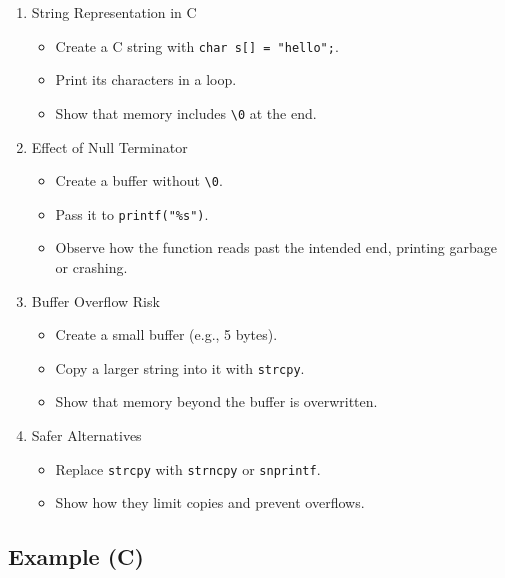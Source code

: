 \documentclass[
  letterpaper,
  DIV=11,
  numbers=noendperiod]{scrreprt}
\providecommand{\tightlist}{%
  \setlength{\itemsep}{0pt}\setlength{\parskip}{0pt}}
\begin{document}
\begin{enumerate}
\def\labelenumi{\arabic{enumi}.}
\item
  String Representation in C

  \begin{itemize}
  \tightlist
  \item
    Create a C string with \texttt{char\ s{[}{]}\ =\ "hello";}.
  \item
    Print its characters in a loop.
  \item
    Show that memory includes
    \texttt{\textquotesingle{}\textbackslash{}0\textquotesingle{}} at
    the end.
  \end{itemize}
\item
  Effect of Null Terminator

  \begin{itemize}
  \tightlist
  \item
    Create a buffer without
    \texttt{\textquotesingle{}\textbackslash{}0\textquotesingle{}}.
  \item
    Pass it to \texttt{printf("\%s")}.
  \item
    Observe how the function reads past the intended end, printing
    garbage or crashing.
  \end{itemize}
\item
  Buffer Overflow Risk

  \begin{itemize}
  \tightlist
  \item
    Create a small buffer (e.g., 5 bytes).
  \item
    Copy a larger string into it with \texttt{strcpy}.
  \item
    Show that memory beyond the buffer is overwritten.
  \end{itemize}
\item
  Safer Alternatives

  \begin{itemize}
  \tightlist
  \item
    Replace \texttt{strcpy} with \texttt{strncpy} or \texttt{snprintf}.
  \item
    Show how they limit copies and prevent overflows.
  \end{itemize}
\end{enumerate}

\subsection{Example (C)}\label{example-c}
\end{document}
